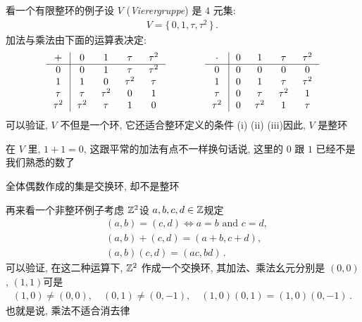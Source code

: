 \begin{example}
    看一个有限整环的例子\period 设 $V$ (\textit{Vierergruppe}) 是 $4$ 元集:
    \begin{align*}
        V = \{\, 0,1,\tau,\tau^2 \,\}\period
    \end{align*}
    加法与乘法由下面的运算表决定:
    \begin{align*}
        \arraycolsep=0.25cm
        \begin{array}{c|cccc}
            +      & 0      & 1      & \tau   & \tau^2 \\ \hline
            0      & 0      & 1      & \tau   & \tau^2 \\
            1      & 1      & 0      & \tau^2 & \tau   \\
            \tau   & \tau   & \tau^2 & 0      & 1      \\
            \tau^2 & \tau^2 & \tau   & 1      & 0      \\
        \end{array}
        \qquad \qquad
        \begin{array}{c|cccc}
            \cdot  & 0 & 1      & \tau   & \tau^2 \\ \hline
            0      & 0 & 0      & 0      & 0      \\
            1      & 0 & 1      & \tau   & \tau^2 \\
            \tau   & 0 & \tau   & \tau^2 & 1      \\
            \tau^2 & 0 & \tau^2 & 1      & \tau   \\
        \end{array}
    \end{align*}
    可以验证, $V$ 不但是一个环, 它还适合整环定义的条件 (i) (ii) (iii)\period 因此, $V$ 是整环\period

    在 $V$ 里, $1+1=0$, 这跟平常的加法有点不一样\period 换句话说, 这里的 $0$ 跟 $1$ 已经不是我们熟悉的数了\period
\end{example}

\begin{example}
    全体偶数作成的集是交换环, 却不是整环\period
\end{example}

\begin{example}
    再来看一个非整环例子\period 考虑 $\mathbb{Z}^2$\period 设 $a,b,c,d \in \mathbb{Z}$\period 规定
    \begin{align*}
         & (a,b) = (c,d) \iff a = b \text{ and } c = d, \\
         & (a,b) + (c,d) = (a+b,c+d),                   \\
         & (a,b)(c,d) = (ac,bd)\period
    \end{align*}
    可以验证, 在这二种运算下, $\mathbb{Z}^2$ 作成一个交换环, 其加法、乘法幺元分别是 $(0,0)$, $(1,1)$\period 可是
    \begin{align*}
        (1,0) \neq (0,0), \quad (0,1) \neq (0,-1), \quad (1,0)(0,1) = (1,0)(0,-1) \period
    \end{align*}
    也就是说, 乘法不适合消去律\period
\end{example}

